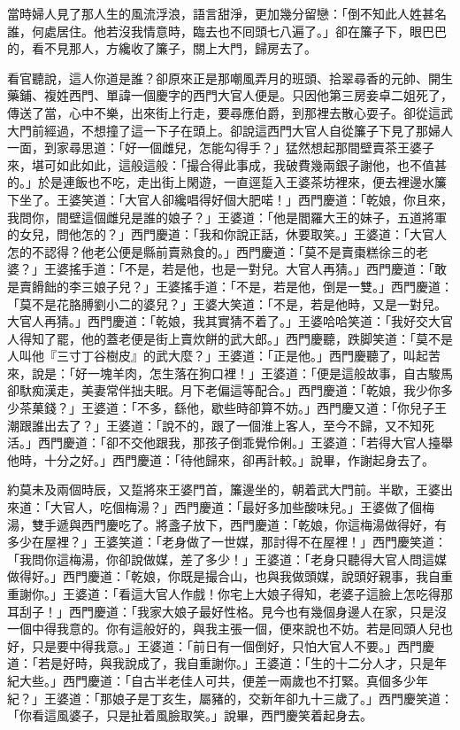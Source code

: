 當時婦人見了那人生的風流浮浪，語言甜淨，更加幾分留戀：「倒不知此人姓甚名誰，何處居住。他若沒我情意時，臨去也不囘頭七八遍了。」{}卻在簾子下，眼巴巴的，看不見那人，方纔收了簾子，關上大門，歸房去了。

看官聽說，這人你道是誰？卻原來正是那嘲風弄月的班頭、拾翠尋香的元帥、開生藥鋪、複姓西門、單諱一個慶字的西門大官人便是。只因他第三房妾卓二姐死了，傳送了當，心中不樂，出來街上行走，要尋應伯爵，到那裡去散心耍子。卻從這武大門前經過，不想撞了這一下子在頭上。卻說這西門大官人自從簾子下見了那婦人一面，到家尋思道：「好一個雌兒，怎能勾得手？」猛然想起那間壁賣茶王婆子來，堪可如此如此，這般這般：「撮合得此事成，我破費幾兩銀子謝他，也不值甚的。」於是連飯也不吃，走出街上閑遊，一直逕踅入王婆茶坊裡來，便去裡邊水簾下坐了。王婆笑道：「大官人卻纔唱得好個大肥喏！」西門慶道：「乾娘，你且來，我問你，間壁這個雌兒是誰的娘子？」王婆道：「他是閻羅大王的妹子，五道將軍的女兒，{}問他怎的？」西門慶道：「我和你說正話，休要取笑。」王婆道：「大官人怎的不認得？他老公便是縣前賣熟食的。」{}西門慶道：「莫不是賣棗糕徐三的老婆？」王婆搖手道：「不是，若是他，也是一對兒。大官人再猜。」西門慶道：「敢是賣餶飿的李三娘子兒？」王婆搖手道：「不是，若是他，倒是一雙。」西門慶道：「莫不是花胳膊劉小二的婆兒？」王婆大笑道：「不是，若是他時，又是一對兒。大官人再猜。」西門慶道：「乾娘，我其實猜不着了。」王婆哈哈笑道：「我好交大官人得知了罷，他的蓋老便是街上賣炊餅的武大郎。」西門慶聽，跌脚笑道：「莫不是人叫他『三寸丁谷樹皮』的武大麼？」王婆道：「正是他。」西門慶聽了，叫起苦來，說是：「好一塊羊肉，怎生落在狗口裡！」王婆道：「便是這般故事，自古駿馬卻馱痴漢走，美妻常伴拙夫眠。月下老偏這等配合。」西門慶道：「乾娘，我少你多少茶菓錢？」{}王婆道：「不多，繇他，歇些時卻算不妨。」西門慶又道：「你兒子王潮跟誰出去了？」王婆道：「說不的，跟了一個淮上客人，至今不歸，又不知死活。」西門慶道：「卻不交他跟我，那孩子倒乖覺伶俐。」王婆道：「若得大官人擡舉他時，十分之好。」西門慶道：「待他歸來，卻再計較。」說畢，作謝起身去了。

約莫未及兩個時辰，又踅將來王婆門首，簾邊坐的，朝着武大門前。半歇，王婆出來道：「大官人，吃個梅湯？」西門慶道：「最好多加些酸味兒。」王婆做了個梅湯，雙手遞與西門慶吃了。將盞子放下，西門慶道：「乾娘，你這梅湯做得好，有多少在屋裡？」王婆笑道：「老身做了一世媒，那討得不在屋裡！」西門慶笑道：「我問你這梅湯，你卻說做媒，差了多少！」王婆道：「老身只聽得大官人問這媒做得好。」西門慶道：「乾娘，你既是撮合山，也與我做頭媒，說頭好親事，{}我自重重謝你。」王婆道：「看這大官人作戲！你宅上大娘子得知，老婆子這臉上怎吃得那耳刮子！」西門慶道：「我家大娘子最好性格。見今也有幾個身邊人在家，只是沒一個中得我意的。你有這般好的，與我主張一個，便來說也不妨。若是囘頭人兒也好，{}只是要中得我意。」王婆道：「前日有一個倒好，只怕大官人不要。」西門慶道：「若是好時，與我說成了，我自重謝你。」王婆道：「生的十二分人才，只是年紀大些。」西門慶道：「自古半老佳人可共，便差一兩歲也不打緊。真個多少年紀？」王婆道：「那娘子是丁亥生，屬豬的，交新年卻九十三歲了。」{}西門慶笑道：「你看這風婆子，只是扯着風臉取笑。」說畢，西門慶笑着起身去。

